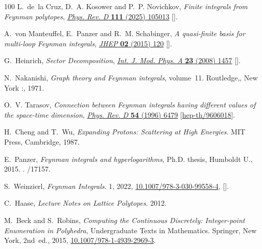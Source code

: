 \documentclass[12pt,a4paper]{article}
\theoremstyle{plain}
\theoremstyle{remark}
\begin{document}
\begin{thebibliography}{100}
L.~de~la Cruz, D.~A. Kosower and P.~P. Novichkov, \emph{{Finite integrals from
  Feynman polytopes}},
  \href{https://doi.org/10.1103/PhysRevD.111.105013}{\emph{Phys. Rev. D}
  {\bfseries 111} (2025) 105013}
  [\href{https://arxiv.org/abs/2410.18014}{{}}].

A.~von Manteuffel, E.~Panzer and R.~M. Schabinger, \emph{{A quasi-finite basis
  for multi-loop Feynman integrals}},
  \href{https://doi.org/10.1007/JHEP02(2015)120}{\emph{JHEP} {\bfseries 02}
  (2015) 120} [\href{https://arxiv.org/abs/1411.7392}{{}}].

G.~Heinrich, \emph{{Sector Decomposition}},
  \href{https://doi.org/10.1142/S0217751X08040263}{\emph{Int. J. Mod. Phys. A}
  {\bfseries 23} (2008) 1457}
  [\href{https://arxiv.org/abs/0803.4177}{{}}].

N.~Nakanishi, \emph{Graph theory and Feynman integrals}, volume~11. Routledge,,
  New York :, 1971.

O.~V. Tarasov, \emph{{Connection between Feynman integrals having different
  values of the space-time dimension}},
  \href{https://doi.org/10.1103/PhysRevD.54.6479}{\emph{Phys. Rev. D}
  {\bfseries 54} (1996) 6479}
  [\href{https://arxiv.org/abs/hep-th/9606018}{{\ttfamily hep-th/9606018}}].

H.~Cheng and T.~Wu, \emph{Expanding Protons: Scattering at High Energies}. MIT
  Press, Cambridge, 1987.

E.~Panzer, \emph{{Feynman integrals and hyperlogarithms}}, Ph.D. thesis,
  Humboldt U., 2015.
\newblock \href{https://arxiv.org/abs/1506.07243}{{}}.
/17157.

S.~Weinzierl, \emph{{Feynman Integrals}}. 1, 2022,
  \href{https://doi.org/10.1007/978-3-030-99558-4}{10.1007/978-3-030-99558-4},
  [\href{https://arxiv.org/abs/2201.03593}{{}}].

C.~Haase, \emph{Lecture Notes on Lattice Polytopes}. 2012.

M.~Beck and S.~Robins, \emph{Computing the Continuous Discretely: Integer-point
  Enumeration in Polyhedra}, Undergraduate Texts in Mathematics. Springer, New
  York, 2nd~ed., 2015,
  \href{https://doi.org/10.1007/978-1-4939-2969-3}{10.1007/978-1-4939-2969-3}.


\end{thebibliography}
\end{document}
